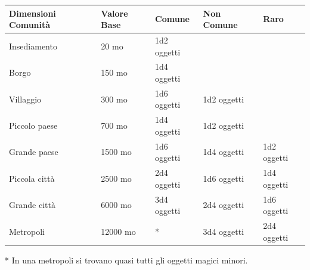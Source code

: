\bigskip

\noindent\begin{tabularx}{\linewidth}{lXXXX}
	\toprule
\rowcolor{gray!20}\textbf{Dimensioni Comunità} & \textbf{Valore Base} & \textbf{Comune} & \textbf{Non Comune} & \textbf{Raro}\\
\toprule
Insediamento& 20 mo & 1d2 oggetti && \\
\rowcolor{gray!20}Borgo & 150 mo& 1d4 oggetti && \\
Villaggio & 300 mo& 1d6 oggetti & 1d2 oggetti& \\
\rowcolor{gray!20}Piccolo paese & 700 mo & 1d4 oggetti & 1d2 oggetti& \\
Grande paese& 1500 mo & 1d6 oggetti & 1d4 oggetti& 1d2 oggetti\\
\rowcolor{gray!20}Piccola città & 2500 mo & 2d4 oggetti & 1d6 oggetti& 1d4 oggetti\\
Grande città& 6000 mo & 3d4 oggetti& 2d4 oggetti& 1d6 oggetti\\
\rowcolor{gray!20}Metropoli & 12000 mo& * & 3d4 oggetti& 2d4 oggetti
\end{tabularx}

* In una metropoli si trovano quasi tutti gli oggetti magici minori.

